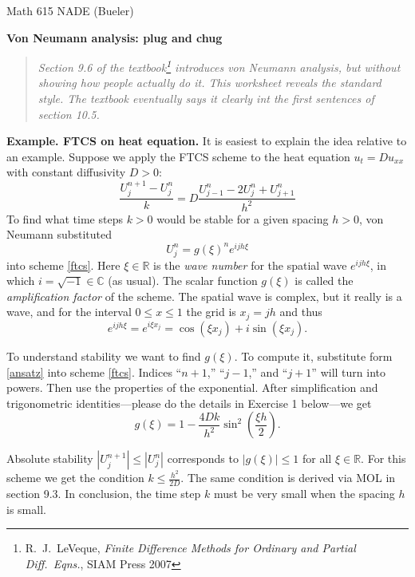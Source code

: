\documentclass[11pt]{amsart}
\newcommand{\CC}{\mathbb{C}}
\newcommand{\RR}{\mathbb{R}}
\newcommand{\prob}[1]{\bigskip\noindent\textbf{#1.}\quad }
\begin{document}
\scriptsize \noindent Math 615 NADE (Bueler) \hfill {}
\normalsize\medskip

\Large\centerline{\textbf{Von Neumann analysis: plug and chug}}
\medskip
\normalsize

\thispagestyle{empty}
\begin{quote}
\emph{Section 9.6 of the textbook\footnote{R.~J.~LeVeque, \emph{Finite Difference Methods for Ordinary and Partial Diff.~Eqns.}, SIAM Press 2007} introduces von Neumann analysis, but without showing how people actually \emph{do} it.  This worksheet reveals the standard style.  The textbook eventually says it clearly int the first sentences of section 10.5.}
\end{quote}


\prob{Example. FTCS on heat equation}  It is easiest to explain the idea relative to an example.  Suppose we apply the FTCS scheme to the heat equation $u_t = D u_{xx}$ with constant diffusivity $D>0$:
\begin{equation}
\frac{U_j^{n+1} - U_j^n}{k} = D \frac{U_{j-1}^n - 2 U_j^n + U_{j+1}^n}{h^2}  \label{ftcs}
\end{equation}
To find what time steps $k>0$ would be stable for a given spacing $h>0$, von Neumann substituted
\begin{equation}
U_j^n = g(\xi)^n e^{ijh\xi}  \label{ansatz}
\end{equation}
into scheme \eqref{ftcs}.  Here $\xi \in \RR$ is the \emph{wave number} for the spatial wave $e^{ijh\xi}$, in which $i=\sqrt{-1} \in \CC$ (as usual).  The scalar function $g(\xi)$ is  called the \emph{amplification factor} of the scheme.  The spatial wave is complex, but it really is a wave, and for the interval $0\le x \le 1$ the grid is $x_j = jh$ and thus
    $$e^{ijh\xi} = e^{i \xi x_j} = \cos(\xi x_j) + i \sin(\xi x_j).$$

To understand stability we want to find $g(\xi)$.  To compute it, substitute form \eqref{ansatz} into scheme \eqref{ftcs}.  Indices ``$n+1$,'' ``$j-1$,'' and ``$j+1$'' will turn into powers.  Then use the properties of the exponential.  After simplification and trigonometric identities---please do the details in Exercise 1 below---we get
    $$g(\xi) = 1 - \frac{4Dk}{h^2} \sin^2\left(\frac{\xi h}{2}\right).$$

Absolute stability $|U_j^{n+1}| \le |U_j^{n}|$ corresponds to $|g(\xi)|\le 1$ for all $\xi \in \RR$.  For this scheme we get the condition $\displaystyle k \le \frac{h^2}{2D}$.  The same condition is derived via MOL in section 9.3.  In conclusion, the time step $k$ must be very small when the spacing $h$ is small.
\end{document}
